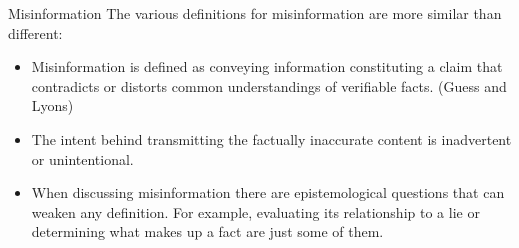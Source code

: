 \documentclass[nobackground,dvipsnames,table]{beamer}
\begin{document}
\begin{frame}{Misinformation}
The various definitions for misinformation are more similar than different:  

\begin{itemize}
    \item Misinformation is defined as conveying information constituting a claim that contradicts or distorts common understandings of verifiable facts. (Guess and Lyons)
    \item The intent behind transmitting the factually inaccurate content is inadvertent or unintentional.
    \item When discussing misinformation there are epistemological questions that can weaken any definition.  For example, evaluating its relationship to a lie or determining what makes up a fact are just some of them.
\end{itemize}

\end{frame}
\end{document}
